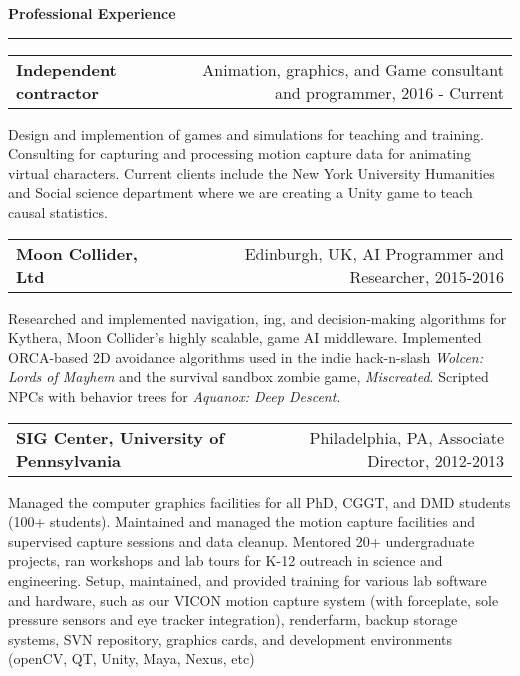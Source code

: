 \needspace{6em}
{\Large {\bf Professional Experience}} 
\vspace{0.1cm}
\hrule
\medskip

\needspace{6em}
\begin{tabular*}{7.1in}{@{}l@{\extracolsep\fill}r}
{\large {\bf Independent contractor}} & Animation, graphics, and Game consultant and programmer, 2016 - Current\\
\end{tabular*}

Design and implemention of games and simulations for teaching and training. Consulting for capturing and processing motion capture data for animating 
virtual characters. Current clients include the New York University Humanities and Social science department where we are creating a Unity game to 
teach causal statistics.
\medskip
\medskip

\needspace{6em}
\begin{tabular*}{7.1in}{@{}l@{\extracolsep\fill}r}
{\large {\bf Moon Collider, Ltd}} & Edinburgh, UK, AI Programmer and Researcher, 2015-2016\\
\end{tabular*}

Researched and implemented navigation, ing, and decision-making algorithms for Kythera, Moon Collider's highly 
scalable, game AI middleware. Implemented ORCA-based 2D avoidance algorithms used in the indie hack-n-slash \emph{Wolcen: Lords of Mayhem} and the survival sandbox zombie game, \emph{Miscreated}. Scripted NPCs with behavior trees for \emph{Aquanox: Deep Descent}.

\medskip
\medskip

\needspace{6em}
\begin{tabular*}{7.1in}{@{}l@{\extracolsep\fill}r}
{\large {\bf SIG Center, University of Pennsylvania}} & Philadelphia, PA, Associate Director, 2012-2013\\
\end{tabular*}

Managed the computer graphics facilities for all PhD, CGGT, and DMD students (100+ students). Maintained and managed the motion capture facilities and supervised capture sessions and data cleanup. Mentored 20+ undergraduate projects, ran workshops and lab tours for K-12 outreach in science and engineering. Setup, maintained, and provided training for various lab software and hardware, such as our VICON motion capture system (with forceplate, sole pressure sensors and eye tracker integration), renderfarm, backup storage systems, SVN repository, graphics cards, and development environments (openCV, QT, Unity, Maya, Nexus, etc)

